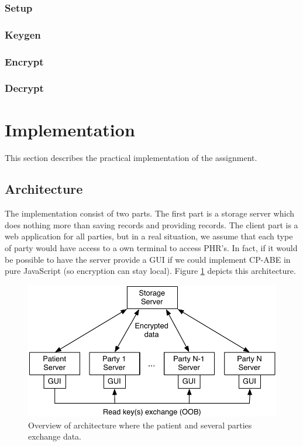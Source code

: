 \documentclass[a4paper]{article}
\begin{document}
		\subsubsection{Setup}
	
		\subsubsection{Keygen}
		
		\subsubsection{Encrypt}
		
		\subsubsection{Decrypt}
    
\section{Implementation}
	This section describes the practical implementation of the assignment.
	
	\subsection{Architecture}
		The implementation consist of two parts. The first part is a storage server which does nothing more than saving records and providing records. The client part is a web application for all parties, but in a real situation, we assume that each type of party would have access to a own terminal to access PHR's. In fact, if it would be possible to have the server provide a GUI if we could implement CP-ABE in pure JavaScript (so encryption can stay local). Figure \ref{fig:architecture} depicts this architecture.
		
		\begin{figure}[H]
	        \centering
            \includegraphics[width=0.75\columnwidth]{figures/architecture.pdf}
	     	\caption{Overview of architecture where the patient and several parties exchange data.}
			\label{fig:architecture}
		\end{figure}
		
\end{document}
